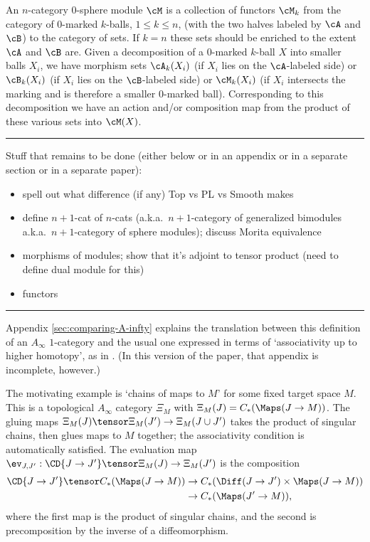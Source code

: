 An $n$-category 0-sphere module $\cM$ is a collection of functors $\cM_k$ from the category
of 0-marked $k$-balls, $1\le k \le n$,
(with the two halves labeled by $\cA$ and $\cB$) to the category of sets.
If $k=n$ these sets should be enriched to the extent $\cA$ and $\cB$ are.
Given a decomposition of a 0-marked $k$-ball $X$ into smaller balls $X_i$, we have
morphism sets $\cA_k(X_i)$ (if $X_i$ lies on the $\cA$-labeled side)
or $\cB_k(X_i)$ (if $X_i$ lies on the $\cB$-labeled side)
or $\cM_k(X_i)$ (if $X_i$ intersects the marking and is therefore a smaller 0-marked ball).
Corresponding to this decomposition we have an action and/or composition map
from the product of these various sets into $\cM(X)$.

\medskip




\medskip
\hrule
\medskip

\medskip


Stuff that remains to be done (either below or in an appendix or in a separate section or in
a separate paper):
\begin{itemize}
\item spell out what difference (if any) Top vs PL vs Smooth makes
\item define $n{+}1$-cat of $n$-cats (a.k.a.\ $n{+}1$-category of generalized bimodules
a.k.a.\ $n{+}1$-category of sphere modules); discuss Morita equivalence
\item morphisms of modules; show that it's adjoint to tensor product
(need to define dual module for this)
\item functors
\end{itemize}

\bigskip

\hrule
{}
\bigskip

Appendix \ref{sec:comparing-A-infty} explains the translation between this definition of an $A_\infty$ $1$-category and the usual one expressed in terms of `associativity up to higher homotopy', as in \cite{MR1854636}. (In this version of the paper, that appendix is incomplete, however.)

The motivating example is `chains of maps to $M$' for some fixed target space $M$. This is a topological $A_\infty$ category $\Xi_M$ with $\Xi_M(J) = C_*(\Maps(J \to M))$. The gluing maps $\Xi_M(J) \tensor \Xi_M(J') \to \Xi_M(J \cup J')$  takes the product of singular chains, then glues maps to $M$ together; the associativity condition is automatically satisfied. The evaluation map $\ev_{J,J'} : \CD{J \to J'} \tensor \Xi_M(J) \to \Xi_M(J')$ is the composition
\begin{align*}
\CD{J \to J'} \tensor C_*(\Maps(J \to M)) & \to C_*(\Diff(J \to J') \times \Maps(J \to M)) \\ & \to C_*(\Maps(J' \to M)),
\end{align*}
where the first map is the product of singular chains, and the second is precomposition by the inverse of a diffeomorphism.

